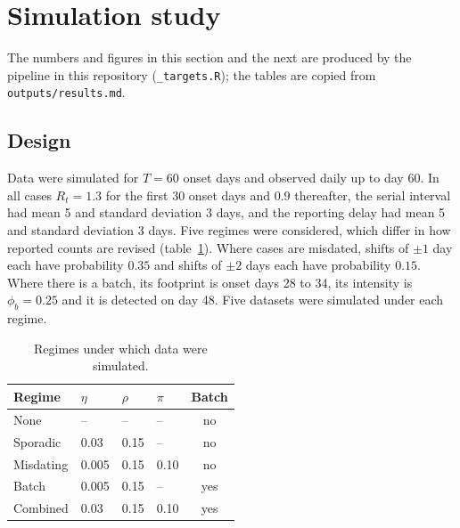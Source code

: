 \documentclass[11pt,a4paper]{article}
\begin{document}
\section{Simulation study}\label{sec:simulation}

The numbers and figures in this section and the next are produced by the
pipeline in this repository (\texttt{\_targets.R}); the tables are copied from
\texttt{outputs/results.md}.

\subsection{Design}

Data were simulated for $T=60$ onset days and observed daily up to day 60. In
all cases $R_t=1.3$ for the first 30 onset days and $0.9$ thereafter, the
serial interval had mean 5 and standard deviation 3 days, and the reporting
delay had mean 5 and standard deviation 3 days. Five regimes were considered,
which differ in how reported counts are revised (table~\ref{tab:regimes}).
Where cases are misdated, shifts of $\pm1$ day each have probability $0.35$
and shifts of $\pm2$ days each have probability $0.15$. Where there is a
batch, its footprint is onset days 28 to 34, its intensity is $\phi_b=0.25$
and it is detected on day 48. Five datasets were simulated under each regime.

\begin{table}[h]
\centering
\begin{tabular}{llllc}
\toprule
Regime & $\eta$ & $\rho$ & $\pi$ & Batch \\
\midrule
None & -- & -- & -- & no \\
Sporadic & 0.03 & 0.15 & -- & no \\
Misdating & 0.005 & 0.15 & 0.10 & no \\
Batch & 0.005 & 0.15 & -- & yes \\
Combined & 0.03 & 0.15 & 0.10 & yes \\
\bottomrule
\end{tabular}
\caption{Regimes under which data were simulated.}\label{tab:regimes}
\end{table}
\end{document}
